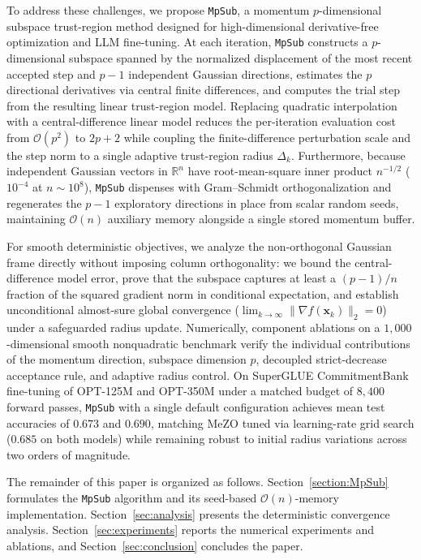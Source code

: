 \documentclass[smallextended]{svjour3}
\newcommand{\bx}{\bm{x}}
\begin{document}
To address these challenges, we propose \texttt{MpSub}, a momentum $p$-dimensional subspace trust-region method designed for high-dimensional derivative-free optimization and LLM fine-tuning. At each iteration, \texttt{MpSub} constructs a $p$-dimensional subspace spanned by the normalized displacement of the most recent accepted step and $p-1$ independent Gaussian directions, estimates the $p$ directional derivatives via central finite differences, and computes the trial step from the resulting linear trust-region model. Replacing quadratic interpolation with a central-difference linear model reduces the per-iteration evaluation cost from $\mathcal{O}(p^2)$ to $2p+2$ while coupling the finite-difference perturbation scale and the step norm to a single adaptive trust-region radius $\Delta_k$. Furthermore, because independent Gaussian vectors in $\mathbb{R}^n$ have root-mean-square inner product $n^{-1/2}$ ($10^{-4}$ at $n \sim 10^8$), \texttt{MpSub} dispenses with Gram--Schmidt orthogonalization and regenerates the $p-1$ exploratory directions in place from scalar random seeds, maintaining $\mathcal{O}(n)$ auxiliary memory alongside a single stored momentum buffer.

For smooth deterministic objectives, we analyze the non-orthogonal Gaussian frame directly without imposing column orthogonality: we bound the central-difference model error, prove that the subspace captures at least a $(p-1)/n$ fraction of the squared gradient norm in conditional expectation, and establish unconditional almost-sure global convergence ($\lim_{k\to\infty}\|\nabla f(\bx_k)\|_2 = 0$) under a safeguarded radius update. Numerically, component ablations on a $1{,}000$-dimensional smooth nonquadratic benchmark verify the individual contributions of the momentum direction, subspace dimension $p$, decoupled strict-decrease acceptance rule, and adaptive radius control. On SuperGLUE CommitmentBank \cite{wang2019superglue} fine-tuning of OPT-125M and OPT-350M under a matched budget of $8{,}400$ forward passes, \texttt{MpSub} with a single default configuration achieves mean test accuracies of $0.673$ and $0.690$, matching MeZO tuned via learning-rate grid search ($0.685$ on both models) while remaining robust to initial radius variations across two orders of magnitude.

The remainder of this paper is organized as follows. Section~\ref{section:MpSub} formulates the \texttt{MpSub} algorithm and its seed-based $\mathcal{O}(n)$-memory implementation. Section~\ref{sec:analysis} presents the deterministic convergence analysis. Section~\ref{sec:experiments} reports the numerical experiments and ablations, and Section~\ref{sec:conclusion} concludes the paper.
\end{document}
